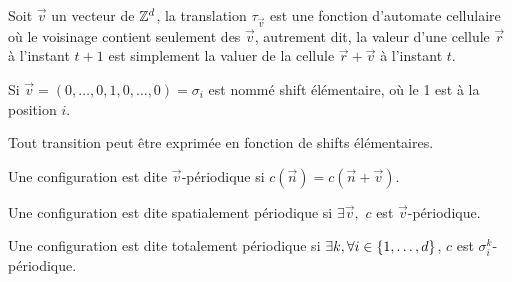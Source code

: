 \begin{definition}
	Soit $\vec v$ un vecteur de $\mathbb{Z}^d$, la translation $\tau_{\vec v}$ est une fonction d'automate cellulaire où le voisinage contient seulement des $\vec v$,
	autrement dit, la valeur d'une cellule $\vec r$ à l'instant $t+1$ est simplement la valuer de la cellule $\vec r + \vec v$ à l'instant $t$.


	Si $\vec v = (0,\ldots,0, 1, 0, \ldots, 0) = \sigma_i$ est nommé shift élémentaire, où le 1 est à la position $i$.

	Tout transition peut être exprimée en fonction de shifts élémentaires.
\end{definition}

\begin{definition}
	Une configuration est dite $\vec v$-périodique si $c(\vec n) = c (\vec n + \vec v)$.
\end{definition}

\begin{definition}
	Une configuration est dite spatialement périodique si $\exists \vec v,$ \tq $c$ est $\vec v$-périodique.
\end{definition}


\begin{definition}
	Une configuration est dite totalement périodique si $\exists k, \forall i \in \left\{1,\ldots,d\right\}$, $c$ est $\sigma_i^k$-périodique.
\end{definition}


